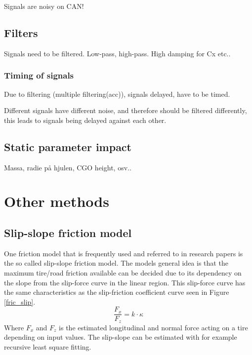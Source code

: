 Signals are noisy on CAN!



\subsection{Filters}

Signals need to be filtered. Low-pass, high-pass. High damping for Cx etc..


\subsubsection{Timing of signals}

Due to filtering (multiple filtering(acc)), signals delayed, have to be timed.

Different signals have different noise, and therefore should be filtered differently, this leads to signals being delayed against each other. 

\subsection{Static parameter impact}

Massa, radie på hjulen, CGO height, osv..

\section{Other methods}

\subsection{Slip-slope friction model}

One friction model that is frequently used and referred to in research papers is the so called slip-slope friction model. The models general idea is that the maximum tire/road friction available can be decided due to its dependency on the slope from the slip-force curve in the linear region. This slip-force curve has the same characteristics as the slip-friction coefficient curve seen in Figure \ref{fric_slip}. 
\begin{equation}
\dfrac{F_{x}}{F_{z}} = k \cdot \kappa
\end{equation}
Where $ F_{x} $ and $ F_{z} $ is the estimated longitudinal and normal force acting on a tire depending on input values. The slip-slope can be estimated with for example recursive least square fitting.
